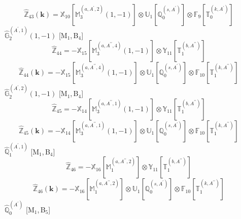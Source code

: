 \documentclass[fleqn,10pt,landscape]{article}
\begin{document}
\begin{itemize}
\begin{dmath*}
\hat{\mathbb{Z}}_{43}(\bm{k})=\mathbb{X}_{10}[\mathbb{M}_{3}^{(a,A^{\prime},2)}(1,-1)] \otimes\mathbb{U}_{1}[\mathbb{Q}_{0}^{(s,A^{\prime})}] \otimes\mathbb{F}_{9}[\mathbb{T}_{0}^{(k,A^{\prime})}]
\end{dmath*}
\vspace{4mm}
\noindent {} $\,\,\,\hat{\mathbb{G}}_{2}^{(A^{\prime},1)}(1,-1)$ [M$_{1}$,\,B$_{4}$]
\begin{dmath*}
\hat{\mathbb{Z}}_{44}=- \mathbb{X}_{15}[\mathbb{M}_{3}^{(a,A^{\prime\prime},4)}(1,-1)] \otimes\mathbb{Y}_{11}[\mathbb{T}_{1}^{(b,A^{\prime\prime})}]
\end{dmath*}
\begin{dmath*}
\hat{\mathbb{Z}}_{44}(\bm{k})=- \mathbb{X}_{15}[\mathbb{M}_{3}^{(a,A^{\prime\prime},4)}(1,-1)] \otimes\mathbb{U}_{1}[\mathbb{Q}_{0}^{(s,A^{\prime})}] \otimes\mathbb{F}_{10}[\mathbb{T}_{1}^{(k,A^{\prime\prime})}]
\end{dmath*}
\vspace{4mm}
\noindent {} $\,\,\,\hat{\mathbb{G}}_{2}^{(A^{\prime},2)}(1,-1)$ [M$_{1}$,\,B$_{4}$]
\begin{dmath*}
\hat{\mathbb{Z}}_{45}=- \mathbb{X}_{14}[\mathbb{M}_{3}^{(a,A^{\prime\prime},1)}(1,-1)] \otimes\mathbb{Y}_{11}[\mathbb{T}_{1}^{(b,A^{\prime\prime})}]
\end{dmath*}
\begin{dmath*}
\hat{\mathbb{Z}}_{45}(\bm{k})=- \mathbb{X}_{14}[\mathbb{M}_{3}^{(a,A^{\prime\prime},1)}(1,-1)] \otimes\mathbb{U}_{1}[\mathbb{Q}_{0}^{(s,A^{\prime})}] \otimes\mathbb{F}_{10}[\mathbb{T}_{1}^{(k,A^{\prime\prime})}]
\end{dmath*}
\vspace{4mm}
\noindent {} $\,\,\,\hat{\mathbb{Q}}_{1}^{(A^{\prime},1)}$ [M$_{1}$,\,B$_{4}$]
\begin{dmath*}
\hat{\mathbb{Z}}_{46}=- \mathbb{X}_{16}[\mathbb{M}_{1}^{(a,A^{\prime\prime},2)}] \otimes\mathbb{Y}_{11}[\mathbb{T}_{1}^{(b,A^{\prime\prime})}]
\end{dmath*}
\begin{dmath*}
\hat{\mathbb{Z}}_{46}(\bm{k})=- \mathbb{X}_{16}[\mathbb{M}_{1}^{(a,A^{\prime\prime},2)}] \otimes\mathbb{U}_{1}[\mathbb{Q}_{0}^{(s,A^{\prime})}] \otimes\mathbb{F}_{10}[\mathbb{T}_{1}^{(k,A^{\prime\prime})}]
\end{dmath*}
\vspace{4mm}
\noindent {} $\,\,\,\hat{\mathbb{Q}}_{0}^{(A^{\prime})}$ [M$_{1}$,\,B$_{5}$]
\begin{dmath*}

\end{dmath*}
\end{itemize}
\end{document}

